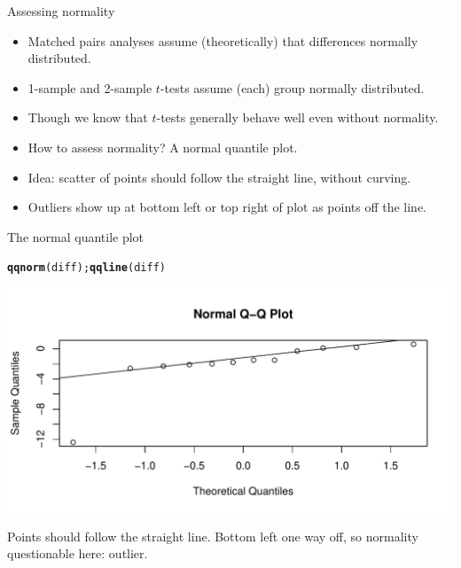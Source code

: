 \documentclass[unknownkeysallowed]{beamer}\usepackage[]{graphicx}\usepackage[]{color}
\makeatletter
\def\maxwidth{ %
  \ifdim\Gin@nat@width>\linewidth
    \linewidth
  \else
    \Gin@nat@width
  \fi
}
\newcommand{\hlstd}[1]{\textcolor[rgb]{0.345,0.345,0.345}{#1}}%
\newcommand{\hlkwd}[1]{\textcolor[rgb]{0.737,0.353,0.396}{\textbf{#1}}}%
\newenvironment{kframe}{%
 \def\at@end@of@kframe{}%
 \ifinner\ifhmode%
  \def\at@end@of@kframe{\end{minipage}}%
  \begin{minipage}{\columnwidth}%
 \fi\fi%
 \def\FrameCommand##1{\hskip\@totalleftmargin \hskip-\fboxsep
 \colorbox{shadecolor}{##1}\hskip-\fboxsep
     \hskip-\linewidth \hskip-\@totalleftmargin \hskip\columnwidth}%
 \MakeFramed {\advance\hsize-\width
   \@totalleftmargin\z@ \linewidth\hsize
   \@setminipage}}%
 {\par\unskip\endMakeFramed%
 \at@end@of@kframe}
\newenvironment{knitrout}{}{} %
\makeatother
\begin{document}
\begin{frame}[fragile]{Assessing normality}

  \begin{itemize}
  \item Matched pairs analyses assume (theoretically) that differences normally
distributed. 
\item 1-sample and 2-sample $t$-tests assume (each) group normally distributed.
\item Though we know that $t$-tests generally behave well even
without normality. 
\item How to assess normality? A normal quantile plot.
\item Idea: scatter of points should follow the straight line, without curving.
\item Outliers show up at bottom left or top right of plot as points
  off the line.
  \end{itemize}


  
\end{frame}

\begin{frame}[fragile]{The normal quantile plot}

\begin{knitrout}
\color{fgcolor}\begin{kframe}
\begin{alltt}
\hlkwd{qqnorm}\hlstd{(diff) ;} \hlkwd{qqline}\hlstd{(diff)}
\end{alltt}
\end{kframe}
\includegraphics[width=\maxwidth]{figure/unnamed-chunk-113-1} 

\end{knitrout}

Points should follow the straight line. Bottom left one way
off, so normality questionable here: outlier.
  
\end{frame}
\end{document}
